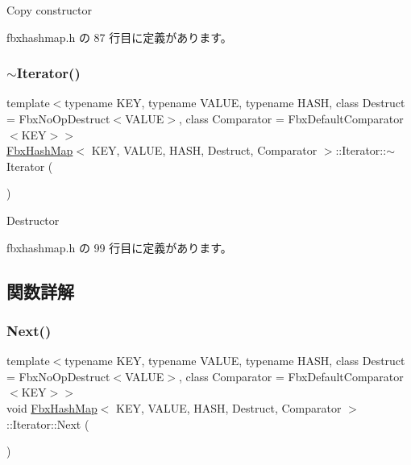 Copy constructor 

 fbxhashmap.\+h の 87 行目に定義があります。

\mbox{\label{class_fbx_hash_map_1_1_iterator_ad8ad3f62e162fecdc73305f0221e54a2}} 
\subsubsection{\texorpdfstring{$\sim$\+Iterator()}{~Iterator()}}
{\footnotesize\ttfamily template$<$typename K\+EY, typename V\+A\+L\+UE, typename H\+A\+SH, class Destruct = Fbx\+No\+Op\+Destruct$<$\+V\+A\+L\+U\+E$>$, class Comparator = Fbx\+Default\+Comparator$<$\+K\+E\+Y$>$$>$ \\
\hyperlink{class_fbx_hash_map}{Fbx\+Hash\+Map}$<$ K\+EY, V\+A\+L\+UE, H\+A\+SH, Destruct, Comparator $>$\+::Iterator\+::$\sim$\+Iterator (\begin{DoxyParamCaption}{ }\end{DoxyParamCaption})\hspace{0.3cm}{\ttfamily [inline]}}

Destructor 

 fbxhashmap.\+h の 99 行目に定義があります。



\subsection{関数詳解}
\mbox{\label{class_fbx_hash_map_1_1_iterator_a258bdc83ad94b6b15dae8c8206123fdb}} 
\subsubsection{\texorpdfstring{Next()}{Next()}}
{\footnotesize\ttfamily template$<$typename K\+EY, typename V\+A\+L\+UE, typename H\+A\+SH, class Destruct = Fbx\+No\+Op\+Destruct$<$\+V\+A\+L\+U\+E$>$, class Comparator = Fbx\+Default\+Comparator$<$\+K\+E\+Y$>$$>$ \\
void \hyperlink{class_fbx_hash_map}{Fbx\+Hash\+Map}$<$ K\+EY, V\+A\+L\+UE, H\+A\+SH, Destruct, Comparator $>$\+::Iterator\+::\+Next (\begin{DoxyParamCaption}{ }\end{DoxyParamCaption})\hspace{0.3cm}{\ttfamily [inline]}}

